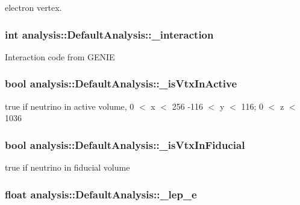 electron vertex. \hypertarget{classanalysis_1_1DefaultAnalysis_a35c01b4be6d678e89cada927ab2ba45c}{
\subsubsection[{\-\_\-interaction}]{\setlength{\rightskip}{0pt plus 5cm}int analysis\-::\-Default\-Analysis\-::\-\_\-interaction\hspace{0.3cm}{\ttfamily [private]}}}\label{classanalysis_1_1DefaultAnalysis_a35c01b4be6d678e89cada927ab2ba45c}
Interaction code from G\-E\-N\-I\-E \hypertarget{classanalysis_1_1DefaultAnalysis_a9c03fca7c9d596e0cb490aef4bcd3aed}{
\subsubsection[{\-\_\-is\-Vtx\-In\-Active}]{\setlength{\rightskip}{0pt plus 5cm}bool analysis\-::\-Default\-Analysis\-::\-\_\-is\-Vtx\-In\-Active\hspace{0.3cm}{\ttfamily [private]}}}\label{classanalysis_1_1DefaultAnalysis_a9c03fca7c9d596e0cb490aef4bcd3aed}
true if neutrino in active volume, 0 $<$ x $<$ 256 -\/116 $<$ y $<$ 116; 0 $<$ z $<$ 1036 \hypertarget{classanalysis_1_1DefaultAnalysis_a3235e005677abb89da08d1668257bca3}{
\subsubsection[{\-\_\-is\-Vtx\-In\-Fiducial}]{\setlength{\rightskip}{0pt plus 5cm}bool analysis\-::\-Default\-Analysis\-::\-\_\-is\-Vtx\-In\-Fiducial\hspace{0.3cm}{\ttfamily [private]}}}\label{classanalysis_1_1DefaultAnalysis_a3235e005677abb89da08d1668257bca3}
true if neutrino in fiducial volume \hypertarget{classanalysis_1_1DefaultAnalysis_ab00e533228597e83340a23d04b986086}{
\subsubsection[{\-\_\-lep\-\_\-e}]{\setlength{\rightskip}{0pt plus 5cm}float analysis\-::\-Default\-Analysis\-::\-\_\-lep\-\_\-e\hspace{0.3cm}{\ttfamily [private]}}}\label{classanalysis_1_1DefaultAnalysis_ab00e533228597e83340a23d04b986086}
